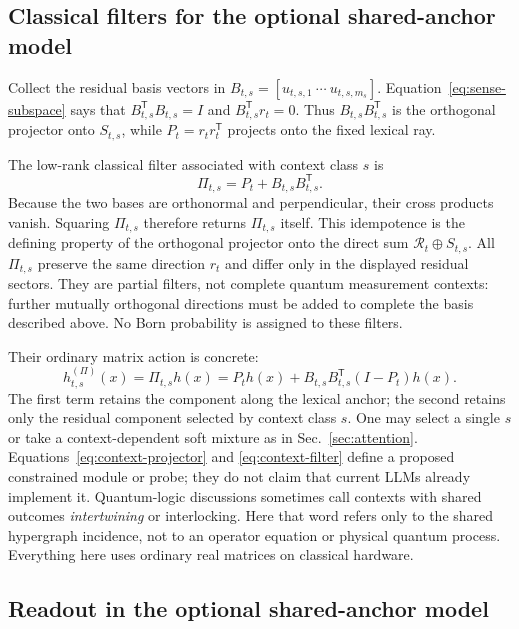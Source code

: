 \documentclass[
  aps,
  reprint,
  superscriptaddress,
  floatfix,
  nofootinbib,
  longbibliography
]{revtex4-2}
\newcommand{\T}{^{\mathsf{T}}}
\begin{document}
\subsection{Classical filters for the optional shared-anchor model}
\label{sec:classical-filters}

Collect the residual basis vectors in
$B_{t,s}=[u_{t,s,1}\ \cdots\ u_{t,s,m_s}]$.  Equation~\eqref{eq:sense-subspace}
says that $B_{t,s}\T B_{t,s}=I$ and $B_{t,s}\T r_t=0$.  Thus
$B_{t,s}B_{t,s}\T$ is the orthogonal projector onto $S_{t,s}$, while
$P_t=r_t r_t\T$ projects onto the fixed lexical ray.

The low-rank classical filter associated with context class $s$ is
%
\begin{equation}
\label{eq:context-projector}
\Pi_{t,s}=P_t+B_{t,s}B_{t,s}\T .
\end{equation}
Because the two bases are orthonormal and perpendicular, their cross products
vanish.  Squaring $\Pi_{t,s}$ therefore returns $\Pi_{t,s}$ itself.  This
idempotence is the defining property of the orthogonal projector onto the
direct sum $\mathcal R_t\oplus S_{t,s}$.
All $\Pi_{t,s}$ preserve the same direction $r_t$ and differ only in the
displayed residual sectors.  They are partial filters, not complete quantum
measurement contexts: further mutually orthogonal directions must be added to
complete the basis described above.  No Born probability is assigned to these
filters.

Their ordinary matrix action is concrete:
%
\begin{equation}
\label{eq:context-filter}
h_{t,s}^{(\Pi)}(x)
=\Pi_{t,s}h(x)
=P_t h(x)+B_{t,s}B_{t,s}\T(I-P_t)h(x).
\end{equation}
%
The first term retains the component along the lexical anchor; the second
retains only the residual component selected by context class $s$.  One may select a
single $s$ or take a context-dependent soft mixture as in
Sec.~\ref{sec:attention}.  Equations~\eqref{eq:context-projector} and
\eqref{eq:context-filter} define a proposed constrained module or probe; they
do not claim that current LLMs already implement it.  Quantum-logic discussions
sometimes call contexts with shared outcomes \emph{intertwining} or
interlocking.  Here that word refers only to the shared hypergraph incidence,
not to an operator equation or physical quantum process.  Everything here uses
ordinary real matrices on classical hardware.

\subsection{Readout in the optional shared-anchor model}
\label{sec:gated}
\end{document}
